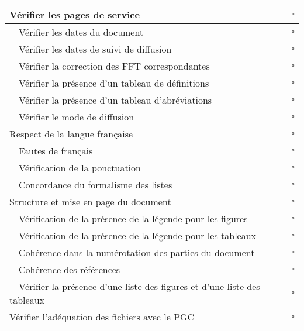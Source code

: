
\begin{table}[H]
\centering
 \begin{tabular}{|l | c|}
 \hline
 \cellcolor{gray!40} Vérifier les pages de service & $\square$ \\
 \hline
  ~~Vérifier les dates du document & $\square$ \\
  ~~Vérifier les dates de suivi de diffusion & $\square$ \\
  ~~Vérifier la correction des FFT correspondantes & $\square$ \\
  ~~Vérifier la présence d'un tableau de définitions & $\square$ \\
  ~~Vérifier la présence d'un tableau d'abréviations & $\square$ \\
  ~~Vérifier le mode de diffusion & $\square$ \\
  \hline
 \cellcolor{gray!40} Respect de la langue française & $\square$ \\
 \hline
  ~~Fautes de français & $\square$ \\
  ~~Vérification de la ponctuation & $\square$ \\
  ~~Concordance du formalisme des listes & $\square$ \\
 \hline
 \cellcolor{gray!40} Structure et mise en page du document & $\square$ \\
 \hline
  ~~Vérification de la présence de la légende pour les figures & $\square$ \\
  ~~Vérification de la présence de la légende pour les tableaux & $\square$ \\
  ~~Cohérence dans la numérotation des parties du document & $\square$ \\
  ~~Cohérence des références & $\square$ \\
  ~~Vérifier la présence d'une liste des figures et d'une liste des tableaux & $\square$ \\
  \hline
  \cellcolor{gray!40} Vérifier l'adéquation des fichiers avec le PGC  & $\square$ \\
  \hline
 \end{tabular}
\end{table}